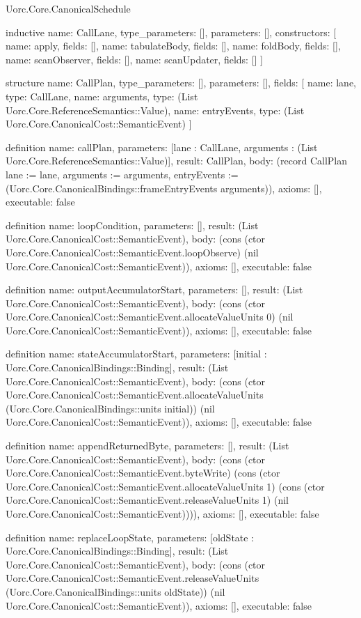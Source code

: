\begin{lexlean}{Uorc.Core.CanonicalSchedule}
\begin{semanticmodule}
inductive{
  name: CallLane,
  type_parameters: [],
  parameters: [],
  constructors: [
    {name: apply, fields: []},
    {name: tabulateBody, fields: []},
    {name: foldBody, fields: []},
    {name: scanObserver, fields: []},
    {name: scanUpdater, fields: []}
  ]
}

structure{
  name: CallPlan,
  type_parameters: [],
  parameters: [],
  fields: [
    {name: lane, type: CallLane},
    {name: arguments, type: (List Uorc.Core.ReferenceSemantics::Value)},
    {name: entryEvents, type: (List Uorc.Core.CanonicalCost::SemanticEvent)}
  ]
}

definition{
  name: callPlan,
  parameters: [lane : CallLane, arguments : (List Uorc.Core.ReferenceSemantics::Value)],
  result: CallPlan,
  body: (record CallPlan {lane := lane, arguments := arguments, entryEvents := (Uorc.Core.CanonicalBindings::frameEntryEvents arguments)}),
  axioms: [],
  executable: false
}

definition{
  name: loopCondition,
  parameters: [],
  result: (List Uorc.Core.CanonicalCost::SemanticEvent),
  body: (cons (ctor Uorc.Core.CanonicalCost::SemanticEvent.loopObserve) (nil Uorc.Core.CanonicalCost::SemanticEvent)),
  axioms: [],
  executable: false
}

definition{
  name: outputAccumulatorStart,
  parameters: [],
  result: (List Uorc.Core.CanonicalCost::SemanticEvent),
  body: (cons (ctor Uorc.Core.CanonicalCost::SemanticEvent.allocateValueUnits 0) (nil Uorc.Core.CanonicalCost::SemanticEvent)),
  axioms: [],
  executable: false
}

definition{
  name: stateAccumulatorStart,
  parameters: [initial : Uorc.Core.CanonicalBindings::Binding],
  result: (List Uorc.Core.CanonicalCost::SemanticEvent),
  body: (cons (ctor Uorc.Core.CanonicalCost::SemanticEvent.allocateValueUnits (Uorc.Core.CanonicalBindings::units initial)) (nil Uorc.Core.CanonicalCost::SemanticEvent)),
  axioms: [],
  executable: false
}

definition{
  name: appendReturnedByte,
  parameters: [],
  result: (List Uorc.Core.CanonicalCost::SemanticEvent),
  body: (cons (ctor Uorc.Core.CanonicalCost::SemanticEvent.byteWrite) (cons (ctor Uorc.Core.CanonicalCost::SemanticEvent.allocateValueUnits 1) (cons (ctor Uorc.Core.CanonicalCost::SemanticEvent.releaseValueUnits 1) (nil Uorc.Core.CanonicalCost::SemanticEvent)))),
  axioms: [],
  executable: false
}

definition{
  name: replaceLoopState,
  parameters: [oldState : Uorc.Core.CanonicalBindings::Binding],
  result: (List Uorc.Core.CanonicalCost::SemanticEvent),
  body: (cons (ctor Uorc.Core.CanonicalCost::SemanticEvent.releaseValueUnits (Uorc.Core.CanonicalBindings::units oldState)) (nil Uorc.Core.CanonicalCost::SemanticEvent)),
  axioms: [],
  executable: false
}


\end{semanticmodule}
\end{lexlean}
